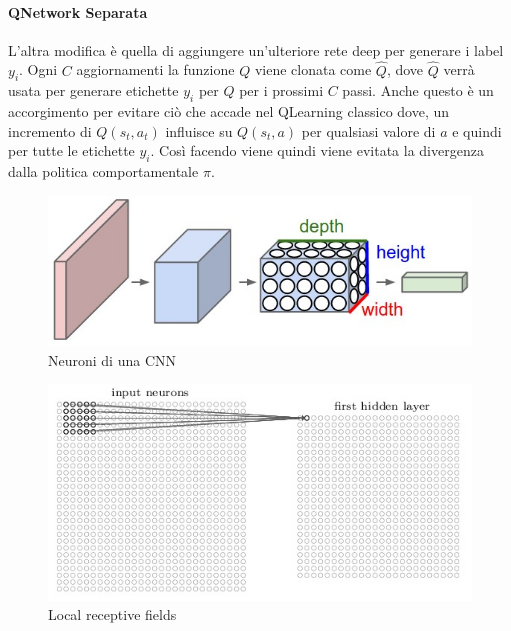 \documentclass[twoside,twocolumn,10pt]{extarticle}
\theoremstyle{definition}
\begin{document}
		\paragraph*{Q\texttwelveudash Network Separata} L'altra modifica è quella di aggiungere un'ulteriore rete deep per generare i label $y_i$. Ogni $C$ aggiornamenti la funzione $Q$ viene clonata come $\hat{Q}$, dove $\hat{Q}$ verrà usata per generare etichette $y_i$ per $Q$ per i prossimi $C$ passi. Anche questo è un accorgimento per evitare ciò che accade nel Q\texttwelveudash Learning classico dove, un incremento di $Q(s_t, a_t)$ influisce su $Q(s_t, a)$ per qualsiasi valore di $a$ e quindi per tutte le etichette $y_i$. Così facendo viene quindi viene evitata la divergenza dalla politica comportamentale $\pi$.

\begin{figure}[h]
	\centering
	\includegraphics[scale=.5]{images/cnn.jpeg}
	\caption{Neuroni di una CNN}
	\label{fig:cnn}
\end{figure}

\begin{figure}[h]
	\centering
	\includegraphics[scale=.5]{images/hlayer.jpeg}
	\caption{Local receptive fields}
	\label{fig:hlayer}
\end{figure}
\end{document}
